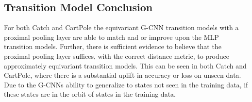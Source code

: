 \subsection{Transition Model Conclusion}
For both Catch and CartPole the equivariant G-CNN transition models with a proximal pooling layer are able to match and or improve upon the MLP transition models. Further, there is sufficient evidence to believe that the proximal pooling layer suffices, with the correct distance metric, to produce approximately equivariant transition models. This can be seen in both Catch and CartPole, where there is a substantial uplift in accuracy or loss on unseen data. Due to the G-CNNs ability to generalize to states not seen in the training data, if these states are in the orbit of states in the training data.
